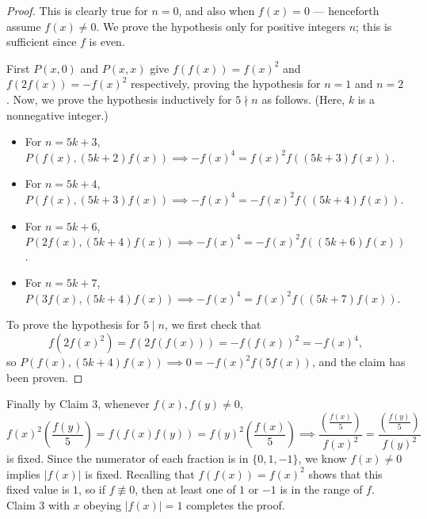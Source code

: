 \begin{proof}
    This is clearly true for $n=0$, and also when $f(x)=0$ --- henceforth assume $f(x)\ne0$. We prove the hypothesis only for positive integers $n$; this is sufficient since $f$ is even.

    First $P(x,0)$ and $P(x,x)$ give $f(f(x))=f(x)^2$ and $f(2f(x))=-f(x)^2$ respectively, proving the hypothesis for $n=1$ and $n=2$. Now, we prove the hypothesis inductively for $5\nmid n$ as follows. (Here, $k$ is a nonnegative integer.)
    \begin{itemize}[itemsep=0em]
        \item For $n=5k+3$, $P(f(x),(5k+2)f(x))\implies-f(x)^4=f(x)^2f( (5k+3)f(x))$.
        \item For $n=5k+4$, $P(f(x),(5k+3)f(x))\implies-f(x)^4=-f(x)^2f( (5k+4)f(x))$.
        \item For $n=5k+6$, $P(2f(x),(5k+4)f(x))\implies-f(x)^4=-f(x)^2f( (5k+6)f(x))$.
        \item For $n=5k+7$, $P(3f(x),(5k+4)f(x))\implies-f(x)^4=f(x)^2f( (5k+7)f(x))$.
    \end{itemize}

    To prove the hypothesis for $5\mid n$, we first check that \[f(2f(x)^2)=f(2f(f(x)))=-f(f(x))^2=-f(x)^4,\]
    so $P(f(x),(5k+4)f(x))\implies0=-f(x)^2f(5f(x))$, and the claim has been proven.
\end{proof}

Finally by Claim 3, whenever $f(x),f(y)\ne0$, \[f(x)^2\left(\frac{f(y)}5\right)=f(f(x)f(y))=f(y)^2\left(\frac{f(x)}5\right)\implies\frac{\left(\frac{f(x)}5\right)}{f(x)^2}=\frac{\left(\frac{f(y)}5\right)}{f(y)^2}\]
is fixed. Since the numerator of each fraction is in $\{0,1,-1\}$, we know $f(x)\ne0$ implies $|f(x)|$ is fixed. Recalling that $f(f(x))=f(x)^2$ shows that this fixed value is $1$, so if $f\not\equiv0$, then at least one of $1$ or $-1$ is in the range of $f$. Claim 3 with $x$ obeying $|f(x)|=1$ completes the proof.

